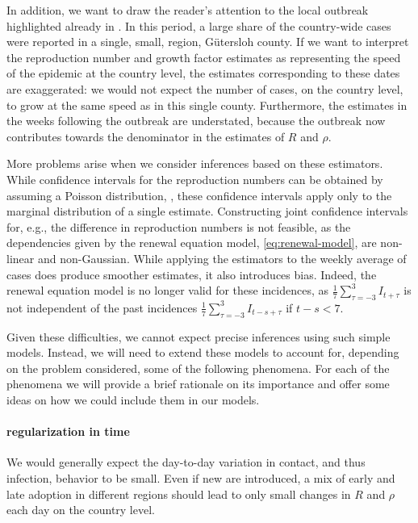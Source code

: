 In addition, we want to draw the reader's attention to the local outbreak highlighted already in . In this period, a large share of the country-wide cases were reported in a single, small, region, Gütersloh county. If we want to interpret the reproduction number and growth factor estimates as representing the speed of the epidemic at the country level, the estimates corresponding to these dates are exaggerated: we would not expect the number of cases, on the country level, to grow at the same speed as in this single county. Furthermore, the estimates in the weeks following the outbreak are understated, because the outbreak now contributes towards the denominator in the estimates of $R$ and $\rho$. 

More problems arise when we consider inferences based on these estimators. While confidence intervals for the reproduction numbers can be obtained by assuming a Poisson distribution, , these confidence intervals apply only to the marginal distribution of a single estimate. Constructing joint confidence intervals for, e.g., the difference in reproduction numbers is not feasible, as the dependencies given by the renewal equation model, \eqref{eq:renewal-model}, are non-linear and non-Gaussian. While applying the estimators to the weekly average of cases does produce smoother estimates, it also introduces bias. Indeed, the renewal equation model is no longer valid for these incidences, as $\frac{1}{7}\sum_{\tau = -3}^3 I_{t + \tau}$ is not independent of the past incidences $\frac{1}7 \sum_{\tau = -3 }^3 I_{t - s +\tau}$ if $t - s < 7$. 


Given these difficulties, we cannot expect precise inferences using such simple models. Instead, we will need to extend these models to account for, depending on the problem considered, some of the following phenomena. For each of the phenomena we will provide a brief rationale on its importance and offer some ideas on how we could include them in our models. 

\paragraph{regularization in time}
We would generally expect the day-to-day variation in contact, and thus infection, behavior to be small. Even if new  are introduced, a mix of early and late adoption in different regions should lead to only small changes in $R$ and $\rho$ each day on the country level. 

